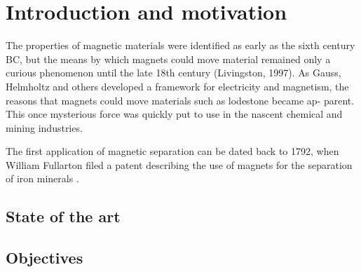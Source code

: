 
\chapter{Introduction and motivation}
\label{ch:Introduction}

The properties of magnetic materials were identified as early
as the sixth century BC, but the means by which magnets could
move material remained only a curious phenomenon until the late
18th century (Livingston, 1997). As Gauss, Helmholtz and others
developed a framework for electricity and magnetism, the reasons
that magnets could move materials such as lodestone became ap-
parent. This once mysterious force was quickly put to use in the
nascent chemical and mining industries. \cite{yavuz2009magnetic}

The first application of magnetic separation can be dated back to 1792, when William Fullarton filed a patent describing the use of magnets for the separation of iron minerals \cite{1794repertory}. 

\section{State of the art}


\cite{mandel2012magnetic}

\section{Objectives}